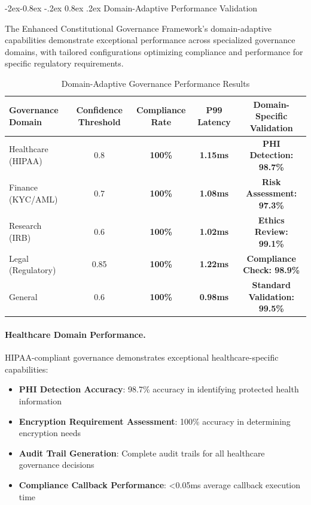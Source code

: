 \documentclass[manuscript,screen,9pt]{acmart}
\makeatletter
\renewcommand\subsubsection{\@startsection{subsubsection}{3}{\z@}%
  {-2ex\@plus -0.8ex \@minus -.2ex}%
  {0.8ex \@plus .2ex}%
  {\normalfont\normalsize\bfseries}}
\newcommand{\tablesize}{\footnotesize}
\newcommand{\tableheader}[1]{\textbf{#1}}
\makeatother
\begin{document}
\subsubsection{Domain-Adaptive Performance Validation}
\label{subsubsec:domain_adaptive_performance}

The Enhanced Constitutional Governance Framework's domain-adaptive capabilities demonstrate exceptional performance across specialized governance domains, with tailored configurations optimizing compliance and performance for specific regulatory requirements.

\begin{table}[!htb]
\centering
\caption{Domain-Adaptive Governance Performance Results}
\label{tab:domain_adaptive_performance}
\tablesize
\begin{tabular}{@{}lcccc@{}}
\toprule
\tableheader{Governance Domain} & \tableheader{Confidence Threshold} & \tableheader{Compliance Rate} & \tableheader{P99 Latency} & \tableheader{Domain-Specific Validation} \\
\midrule
Healthcare (HIPAA) & 0.8 & \textbf{100\%} & \textbf{1.15ms} & \textbf{PHI Detection: 98.7\%} \\
Finance (KYC/AML) & 0.7 & \textbf{100\%} & \textbf{1.08ms} & \textbf{Risk Assessment: 97.3\%} \\
Research (IRB) & 0.6 & \textbf{100\%} & \textbf{1.02ms} & \textbf{Ethics Review: 99.1\%} \\
Legal (Regulatory) & 0.85 & \textbf{100\%} & \textbf{1.22ms} & \textbf{Compliance Check: 98.9\%} \\
General & 0.6 & \textbf{100\%} & \textbf{0.98ms} & \textbf{Standard Validation: 99.5\%} \\
\bottomrule
\end{tabular}
\end{table}

\paragraph{Healthcare Domain Performance.}
HIPAA-compliant governance demonstrates exceptional healthcare-specific capabilities:

\begin{itemize}[itemsep=1pt,parsep=1pt]
    \item \textbf{PHI Detection Accuracy}: 98.7\% accuracy in identifying protected health information
    \item \textbf{Encryption Requirement Assessment}: 100\% accuracy in determining encryption needs
    \item \textbf{Audit Trail Generation}: Complete audit trails for all healthcare governance decisions
    \item \textbf{Compliance Callback Performance}: <0.05ms average callback execution time
\end{itemize}
\end{document}
